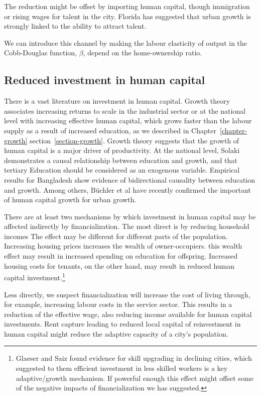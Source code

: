 The reduction might be offset by importing human capital, though immigration or rising wages for talent in the city. Florida\cite{floridaCompetingAgeTalent2005, floridaCreativeClassEconomic2014} has suggested that urban growth is strongly linked to the ability to attract talent. 

We can introduce this channel by making  the labour elasticity of output in the Cobb-Douglas function, $\beta$, depend on the home-ownership ratio.  


\subsection{Reduced investment in human capital}

There is a vast literature on investment in human capital. 
Growth theory associates increasing returns to scale in the industrial sector or at the national level with increasing effective human capital, which grows faster than the labour supply as a result of increased education, as we described in Chapter~\ref{chapter-growth} section~\ref{section-growth}. 
Growth theory suggests that the growth of human capital is  a major driver of productivity.  At the national level, Solaki \cite{solakiRelationshipEducationGDP2013} demonstrates a causal relationship between education and growth, and that tertiary Education should be considered as an exogenous variable.  Empirical results for Bangladesh \cite{islam2007relationship}show evidence of bidirectional causality between education and growth.  Among others, B\"uchler et al have recently confirmed the important of human capital growth for urban growth.

There are at least two mechanisms by which investment in human capital may be affected indirectly by financialization. The most direct is by reducing household incomes The effect may be different for different parts of the population. Increasing housing prices increases the wealth of owner-occupiers. this wealth effect may result in increased spending on education for offspring. Increased housing costs for tenants, on the other hand,  may result in reduced human capital investment.\footnote{Glaeser and Saiz found evidence for skill upgrading in declining cities, which suggested to them efficient investment in less skilled workers is a key adaptive/growth mechanism. If powerful enough this effect might offset some of the negative impacts of financialization we has suggested.}  

Less directly, we suspect financialization will increase the cost of living through, for example, increasing labour costs in the service sector. This results in a reduction of the effective wage, also reducing income available for human capital investments. Rent capture leading to reduced local capital of reinvestment in human capital might reduce the adaptive capacity of a city's population.


